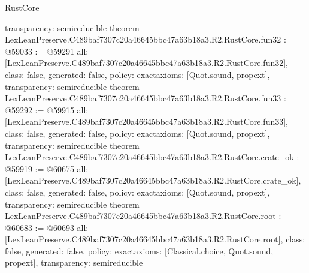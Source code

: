 \begin{lexlean}{RustCore}
\begin{coremodule}
{  transparency: semireducible
}
theorem LexLeanPreserve.C489baf7307c20a46645bbc47a63b18a3.R2.RustCore.fun32 : @59033 := @59291 {
  all: [LexLeanPreserve.C489baf7307c20a46645bbc47a63b18a3.R2.RustCore.fun32],
  class: false,
  generated: false,
  policy: exact{axioms: [Quot.sound, propext]},
  transparency: semireducible
}
theorem LexLeanPreserve.C489baf7307c20a46645bbc47a63b18a3.R2.RustCore.fun33 : @59292 := @59915 {
  all: [LexLeanPreserve.C489baf7307c20a46645bbc47a63b18a3.R2.RustCore.fun33],
  class: false,
  generated: false,
  policy: exact{axioms: [Quot.sound, propext]},
  transparency: semireducible
}
theorem LexLeanPreserve.C489baf7307c20a46645bbc47a63b18a3.R2.RustCore.crate_ok : @59919 := @60675 {
  all: [LexLeanPreserve.C489baf7307c20a46645bbc47a63b18a3.R2.RustCore.crate_ok],
  class: false,
  generated: false,
  policy: exact{axioms: [Quot.sound, propext]},
  transparency: semireducible
}
theorem LexLeanPreserve.C489baf7307c20a46645bbc47a63b18a3.R2.RustCore.root : @60683 := @60693 {
  all: [LexLeanPreserve.C489baf7307c20a46645bbc47a63b18a3.R2.RustCore.root],
  class: false,
  generated: false,
  policy: exact{axioms: [Classical.choice, Quot.sound, propext]},
  transparency: semireducible
}


\end{coremodule}
\end{lexlean}
